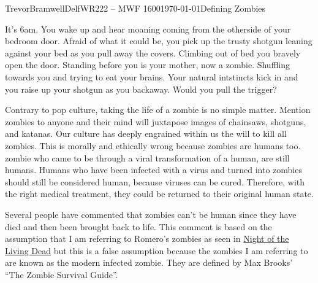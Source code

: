 \documentclass[12pt,letterpaper]{article}
\begin{document}
\begin{mla}{Trevor}{Bramwell}{Delf}{WR222 -- MWF 1600}{\today}{Defining Zombies}

It's 6am. You wake up and hear moaning coming from the otherside of your
bedroom door. Afraid of what it could be, you pick up the trusty shotgun
leaning against your bed as you pull away the covers. Climbing out of bed
you bravely open the door. Standing before you is your mother, now a zombie.
Shuffling towards you and trying to eat your brains. Your natural intstincts
kick in and you raise up your shotgun as you backaway.
Would you pull the trigger?

Contrary to pop culture, taking the life of a zombie is no simple matter.
Mention zombies to anyone and their mind will juxtapose images of
chainsaws, shotguns, and katanas. Our culture has deeply engrained within us
the will to kill all zombies. This is morally and ethically wrong
because zombies are humans too. zombie who came to be through a viral
transformation of a human, are still humans.\label{thesis}  
Humans who have been infected with a virus and turned into zombies should
still be considered human, because viruses can be cured. Therefore, with the
right medical treatment, they could be returned to their original human state.

Several people have commented that zombies can't be human since they have died
and then been brought back to life. This comment is based on the assumption
that I am referring to Romero's zombies as seen in \underline{Night of the
Living Dead} but this is a false assumption because the zombies I am referring
to are known as the modern infected zombie. They are defined by Max Brooks' 
``The Zombie Survival Guide''.







\end{mla}
\end{document}

